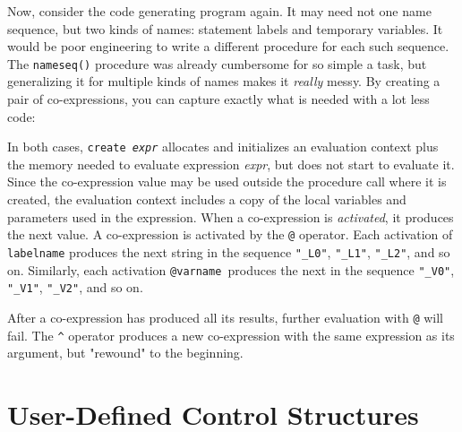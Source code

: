 
Now, consider the code generating program again. It may need not one
name sequence, but two kinds of names: statement labels and
temporary variables. It would be poor engineering to write a different
procedure for each such sequence. The \texttt{nameseq()}
procedure was already cumbersome for so simple a task, but generalizing
it for multiple kinds of names makes it \textit{really} messy. By
creating a pair of co-expressions, you can capture exactly what is
needed with a lot less code:


\noindent
In both cases, \texttt{create}\texttt{
}\texttt{\textit{expr}} allocates and initializes an evaluation context
plus the memory needed to evaluate expression \textit{expr}, but does
not start to evaluate it. Since the co-expression value may be used
outside the procedure call where it is created, the evaluation context
includes a copy of the local variables and parameters used in the
expression. When a co-expression is \textit{activated}, it produces the
next value. A co-expression is activated by the \texttt{@} operator. Each
activation of \texttt{labelname} produces the next string in the
sequence \texttt{"\_L0"},
\texttt{"\_L1"},
\texttt{"\_L2"}, and so on. Similarly, each
activation \texttt{@varname}\texttt{ }produces the next in the sequence
\texttt{"\_V0"},
\texttt{"\_V1"},
\texttt{"\_V2"}, and so on. 


After a co-expression has produced all its results, further evaluation
with \texttt{@} will fail. The \texttt{\^{}}
operator produces a new co-expression with the same expression as its
argument, but "rewound" to the beginning.


\section{User-Defined Control Structures}

